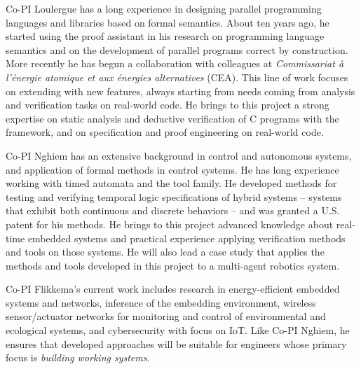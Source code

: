 Co-PI Loulergue has a long experience in designing parallel programming languages and libraries based on formal semantics. About ten years ago, he started using the \Coq proof assistant in his research on programming language semantics and on the development of parallel programs correct by construction. More recently he has begun a collaboration with colleagues at {\it Commissariat \`a l'\'energie atomique et aux \'energies alternatives} (CEA). This line of work focuses on extending \framac with new features, always starting from needs coming from analysis and verification tasks on real-world code. He brings to this project a strong expertise on static analysis and deductive verification of C programs with the \framac framework, and on specification and proof engineering on real-world code. 

Co-PI Nghiem has an extensive background in control and autonomous systems, and application of formal methods in control systems.
He has long experience working with timed automata and the \uppaal tool family.
He developed methods for testing and verifying temporal logic specifications of hybrid systems -- systems that exhibit both continuous and discrete behaviors -- and was granted a U.S. patent for his methods.
He brings to this project advanced knowledge about real-time embedded systems and practical experience applying verification methods and tools on those systems.
He will also lead a case study that applies the methods and tools developed in this project to a multi-agent robotics system.

Co-PI Flikkema's current work includes research in energy-efficient embedded systems and networks, inference of the embedding environment, wireless sensor/actuator networks for monitoring and control of environmental and ecological systems, and cybersecurity with focus on IoT.  Like Co-PI Nghiem, he ensures that developed approaches will be suitable for engineers whose primary focus is \emph{building working systems}.